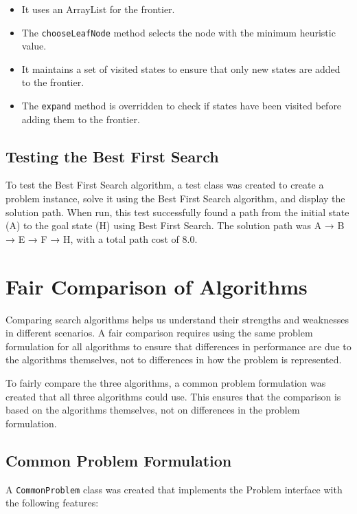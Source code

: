 \documentclass[12pt,a4paper]{article}
\newenvironment{infobox}[1]
  {\begin{tcolorbox}[colback=boxcolor,colframe=sectioncolor,title=#1,fonttitle=\bfseries]}
  {\end{tcolorbox}}
\begin{document}
\begin{itemize}
    \item It uses an ArrayList for the frontier.
    \item The \texttt{chooseLeafNode} method selects the node with the minimum heuristic value.
    \item It maintains a set of visited states to ensure that only new states are added to the frontier.
    \item The \texttt{expand} method is overridden to check if states have been visited before adding them to the frontier.
\end{itemize}

\subsection{Testing the Best First Search}

To test the Best First Search algorithm, a test class was created to create a problem instance, solve it using the Best First Search algorithm, and display the solution path. When run, this test successfully found a path from the initial state (A) to the goal state (H) using Best First Search. The solution path was A → B → E → F → H, with a total path cost of 8.0.

\section{Fair Comparison of Algorithms}

\begin{infobox}{Why Compare Algorithms?}
Comparing search algorithms helps us understand their strengths and weaknesses in different scenarios. A fair comparison requires using the same problem formulation for all algorithms to ensure that differences in performance are due to the algorithms themselves, not to differences in how the problem is represented.
\end{infobox}

To fairly compare the three algorithms, a common problem formulation was created that all three algorithms could use. This ensures that the comparison is based on the algorithms themselves, not on differences in the problem formulation.

\subsection{Common Problem Formulation}

A \texttt{CommonProblem} class was created that implements the Problem interface with the following features:
\end{document}
